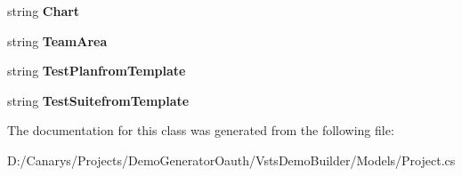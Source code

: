 \begin{DoxyCompactItemize}
\item 
\mbox{\label{class_vsts_demo_builder_1_1_models_1_1_project_template_af377911831dddd06581d32d8d8761172}} 
string {\bfseries Chart}
\item 
\mbox{\label{class_vsts_demo_builder_1_1_models_1_1_project_template_a93b64ac05fa6973f3bde031ec58e7058}} 
string {\bfseries Team\+Area}
\item 
\mbox{\label{class_vsts_demo_builder_1_1_models_1_1_project_template_ab678d4520341927ca9a056f05bdbee57}} 
string {\bfseries Test\+Planfrom\+Template}
\item 
\mbox{\label{class_vsts_demo_builder_1_1_models_1_1_project_template_aee470b9e03da4ef4511a69f836ae17ef}} 
string {\bfseries Test\+Suitefrom\+Template}
\end{DoxyCompactItemize}


The documentation for this class was generated from the following file\+:\begin{DoxyCompactItemize}
\item 
D\+:/\+Canarys/\+Projects/\+Demo\+Generator\+Oauth/\+Vsts\+Demo\+Builder/\+Models/Project.\+cs\end{DoxyCompactItemize}
